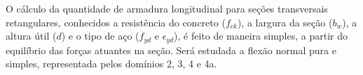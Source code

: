 O cálculo da quantidade de armadura longitudinal para seções transversais retangulares, conhecidos a resistência do concreto ($f_{ck}$), a largura da seção ($b_w$), a altura útil ($d$) e o tipo de aço ($f_{yd}$ e $\epsilon_{yd}$), é feito de maneira simples, a partir do equilíbrio das forças atuantes na seção. Será estudada a flexão normal pura e simples, representada pelos domínios 2, 3, 4 e 4a.


